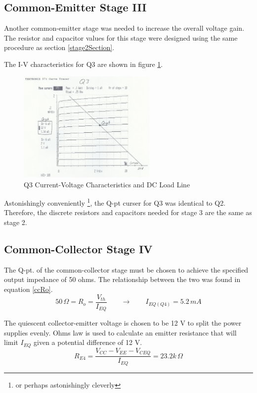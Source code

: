 \documentclass[titlepage, letterpaper, 11pt]{article}
\begin{document}
\subsection{Common-Emitter Stage III}

Another common-emitter stage was needed to increase the overall
voltage gain. The resistor and capacitor values for this stage were
designed using the same procedure as section \ref{stage2Section}.

The I-V characteristics for Q3 are shown in figure 
\ref{q3Characteristics}.

\begin{figure}[ht]
	\centering
	\includegraphics[width=0.6\textwidth]
		{measurements/q3Characteristics}
	\caption{
		Q3 Current-Voltage Characteristics and DC Load Line
	}
	\label{q3Characteristics}
\end{figure}

Astonishingly conveniently
\footnote{or perhaps astonishingly cleverly},
the Q-pt curser for Q3 was identical to Q2. Therefore, the discrete
resistors and capacitors needed for stage 3 are the same as stage 2.

\subsection{Common-Collector Stage IV}

The Q-pt. of the common-collector stage must be chosen to achieve the
specified output impedance of 50 ohms. The relationship between the
two was found in equation \ref{ccRo}.
\begin{equation*}
50\,\Omega=R_{o}=\frac{V_{th}}{I_{EQ}}
\qquad\rightarrow\qquad I_{EQ(Q4)}=5.2\,mA
\end{equation*}

The quiescent collector-emitter voltage is chosen to be 12 V to split
the power supplies evenly. Ohms law is used to calculate an emitter
resistance that will limit $I_{EQ}$ given a potential difference of
12 V.
\begin{equation*}
R_{E4}=\frac{V_{CC}-V_{EE}-V_{CEQ}}{I_{EQ}}=23.2k\,\Omega
\end{equation*}
\end{document}
